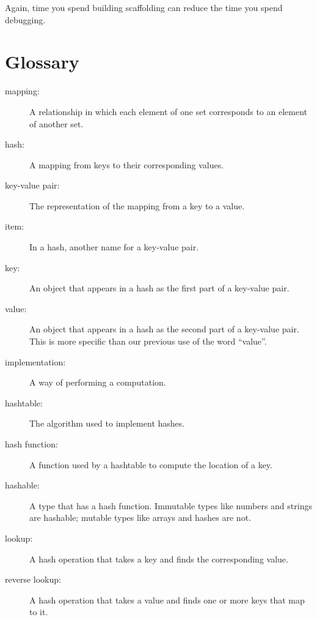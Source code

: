 Again, time you spend building scaffolding can reduce
the time you spend debugging.


\section{Glossary}

\begin{description}

\item[mapping:] A relationship in which each element of one set
corresponds to an element of another set.

\item[hash:] A mapping from keys to their
corresponding values.

\item[key-value pair:] The representation of the mapping from
a key to a value.

\item[item:] In a hash, another name for a key-value
  pair.

\item[key:] An object that appears in a hash as the
first part of a key-value pair.

\item[value:] An object that appears in a hash as the
second part of a key-value pair.  This is more specific than
our previous use of the word ``value''.

\item[implementation:] A way of performing a computation.

\item[hashtable:] The algorithm used to implement hashes.

\item[hash function:] A function used by a hashtable to 
compute the location of a key.

\item[hashable:] A type that has a hash function.  Immutable
types like numbers and strings are hashable; mutable types 
like arrays and hashes are not.

\item[lookup:] A hash operation that takes a key and finds
the corresponding value.

\item[reverse lookup:] A hash operation that takes a value and finds
one or more keys that map to it.


\end{description}
